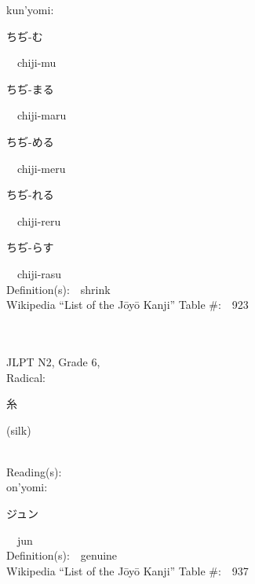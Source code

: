 \begin{multicols}{2}
{\hspace*{1em}}kun'yomi:\ \ \\
{\hspace*{2em}}{\begin{CJK}{UTF8}{min} ちぢ-む \end{CJK}}\ \ chiji-mu\ \ \\
{\hspace*{2em}}{\begin{CJK}{UTF8}{min} ちぢ-まる \end{CJK}}\ \ chiji-maru\ \ \\
{\hspace*{2em}}{\begin{CJK}{UTF8}{min} ちぢ-める \end{CJK}}\ \ chiji-meru\ \ \\
{\hspace*{2em}}{\begin{CJK}{UTF8}{min} ちぢ-れる \end{CJK}}\ \ chiji-reru\ \ \\
{\hspace*{2em}}{\begin{CJK}{UTF8}{min} ちぢ-らす \end{CJK}}\ \ chiji-rasu\ \ \\
Definition(s):\ \ shrink \\
Wikipedia ``List of the J\=oy\=o Kanji'' Table \#:\ \ 923 \\
\ \ \\
{\fontsize{34pt}{40pt}  }\ \ \\  %
{JLPT N2, Grade 6, \\Radical:\ \ {\begin{CJK}{UTF8}{min} 糸 \end{CJK}} (silk) } \\
Reading(s):\ \ \\
{\hspace*{1em}}on'yomi:\ \ \\
{\hspace*{2em}}{\begin{CJK}{UTF8}{min} ジュン \end{CJK}}\ \ jun\ \ \\
Definition(s):\ \ genuine \\
Wikipedia ``List of the J\=oy\=o Kanji'' Table \#:\ \ 937 \\

\end{multicols}
